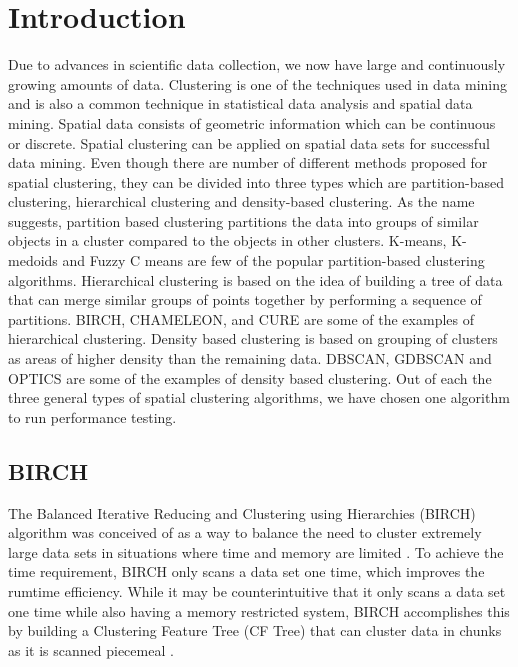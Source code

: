 \documentclass[conference, 10pt]{IEEEtran}
\begin{document}
  \section{Introduction}
  Due to advances in scientific data collection, we now have large and continuously growing amounts of data. Clustering is one of the techniques used in data mining and is also a common technique in statistical data analysis and spatial data mining. Spatial data consists of geometric information which can be continuous or discrete. Spatial clustering can be applied on spatial data sets for successful data mining. Even though there are number of different methods proposed for spatial clustering, they can be divided into three types which are partition-based clustering, hierarchical clustering and density-based clustering.  As the name suggests, partition based clustering partitions the data into groups of similar objects in a cluster compared to the objects in other clusters.  K-means, K-medoids and Fuzzy C means are few of the popular partition-based clustering algorithms.  Hierarchical clustering is based on the idea of building a tree of data that can merge similar groups of points together by performing a sequence of partitions. BIRCH, CHAMELEON, and CURE are some of the examples of hierarchical clustering.  Density based clustering is based on grouping of clusters as areas of higher density than the remaining data. DBSCAN, GDBSCAN and OPTICS are some of the examples of density based clustering. Out of each the three general types of spatial clustering algorithms, we have chosen one algorithm to run performance testing.

  \subsection{BIRCH}

  The Balanced Iterative Reducing and Clustering using Hierarchies (BIRCH) algorithm was conceived of as a way to balance the need to cluster extremely large data sets in situations where time and memory are limited \cite{birch}. To achieve the time requirement, BIRCH only scans a data set one time, which improves the rumtime efficiency. While it may be counterintuitive that it only scans a data set one time while also having a memory restricted system, BIRCH accomplishes this by building a Clustering Feature Tree (CF Tree) that can cluster data in chunks as it is scanned piecemeal \cite{birch}.
\end{document}
